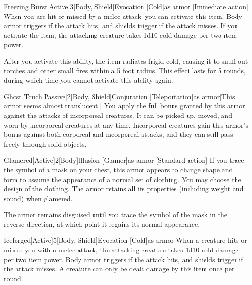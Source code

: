         \begin{magicitemdef}{Freezing Burst}[Active]{3}[Body, Shield]{Evocation [Cold]}{as armor}
            [Immediate action] When you are hit or missed by a melee attack, you can activate this item.
            Body armor triggers if the attack hits, and shields trigger if the attack misses.
            If you activate the item, the attacking creature takes 1d10 cold damage per two item power.

            After you activate this ability, the item radiates frigid cold, causing it to snuff out torches and other small fires within a 5 foot radius.
            This effect lasts for 5 rounds, during which time you cannot activate this ability again.
        \end{magicitemdef}

        \begin{magicitemdef}{Ghost Touch}[Passive]{2}[Body, Shield]{Conjuration [Teleportation]}{as armor}[This armor seems almost translucent.]
             You apply the full bonus granted by this armor against the attacks of incorporeal creatures.
            It can be picked up, moved, and worn by incorporeal creatures at any time.
            Incorporeal creatures gain this armor's bonus against both corporeal and incorporeal attacks, and they can still pass freely through solid objects.
        \end{magicitemdef}

        \begin{magicitemdef}{Glamered}[Active]{2}[Body]{Illusion [Glamer]}{as armor}
            [Standard action] If you trace the symbol of a mask on your chest, this armor appears to change shape and form to assume the appearance of a normal set of clothing.
            You may choose the design of the clothing.
            The armor retains all its properties (including weight and sound) when glamered.

            The armor remains disguised until you trace the symbol of the mask in the reverse direction, at which point it regains its normal appearance.
        \end{magicitemdef}

        \begin{magicitemdef}{Iceforged}[Active]{5}[Body, Shield]{Evocation [Cold]}{as armor}
             When a creature hits or misses you with a melee attack, the attacking creature takes 1d10 cold damage per two item power.
            Body armor triggers if the attack hits, and shields trigger if the attack misses.
            A creature can only be dealt damage by this item once per round.
        \end{magicitemdef}

